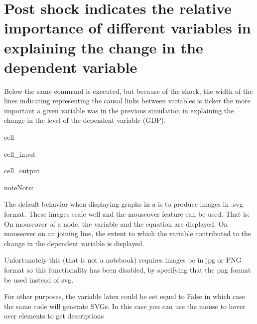 \documentclass[letterpaper,10pt,english]{jupyterBook}
\begin{document}
\section{Post shock  indicates the relative importance of different variables in explaining the change in the dependent variable}
\label{\detokenize{content/06_ModelAnalytics/ModelStructure:post-shock-tracepre-indicates-the-relative-importance-of-different-variables-in-explaining-the-change-in-the-dependent-variable}}
\sphinxAtStartPar
Below the same command is executed, but because of the shock, the width of the lines indicating representing the causal links between variables is ticker the more important a given variable was in the previous simulation in explaining the change in the level of the dependent variable (GDP).

\begin{sphinxuseclass}{cell}\begin{sphinxVerbatimInput}

\begin{sphinxuseclass}{cell_input}
\begin{sphinxVerbatim}[commandchars=\\\{\}]
\end{sphinxVerbatim}

\end{sphinxuseclass}\end{sphinxVerbatimInput}
\begin{sphinxVerbatimOutput}

\begin{sphinxuseclass}{cell_output}
\noindent{}

\end{sphinxuseclass}\end{sphinxVerbatimOutput}

\end{sphinxuseclass}
\begin{sphinxadmonition}{note}{Note:}
\sphinxAtStartPar
{}

\sphinxAtStartPar
The default behavior when displaying graphs in a  is to produce images in .svg format.
These images scale well and the mouseover feature can be used. That is: On mouseover of a node, the variable and the equation are displayed.  On mouseover on an joining line, the extent to which the variable contributed to the change in the dependent variable is displayed.

\sphinxAtStartPar
Unfortunately this  (that is not a notebook) requires images be in  jpg or PNG format so this functionality has been disabled, by specifying that the png format be used instead of svg.

\sphinxAtStartPar
For other purposes, the variable latex could be set equal to False in which case the same code will generate SVGs. In this case you can use the mouse to hover over elements to get descriptions
\end{sphinxadmonition}
\end{document}
